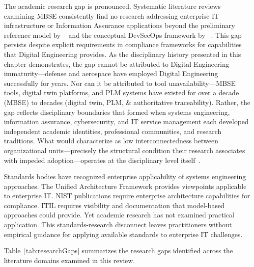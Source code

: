 The academic research gap is pronounced. Systematic literature reviews examining MBSE consistently find no research addressing enterprise IT infrastructure or Information Assurance applications beyond the preliminary reference model by \citeauthor{Bonar_Hastings_2024}~\parencite{Bonar_Hastings_2024} and the conceptual DevSecOps framework by \citeauthor{CMU_SEI_DevSecOps_2023}~\parencite{CMU_SEI_DevSecOps_2023}. This gap persists despite explicit requirements in compliance frameworks for capabilities that Digital Engineering provides. As the disciplinary history presented in this chapter demonstrates, the gap cannot be attributed to Digital Engineering immaturity---defense and aerospace have employed Digital Engineering successfully for years. Nor can it be attributed to tool unavailability---MBSE tools, digital twin platforms, and PLM systems have existed for over a decade (MBSE) to decades (digital twin, PLM, \& authoritative traceability). Rather, the gap reflects disciplinary boundaries that formed when systems engineering, information assurance, cybersecurity, and IT service management each developed independent academic identities, professional communities, and research traditions. What \citeauthor{Henderson_Salado_2024_Org} would characterize as low interconnectedness between organizational units---precisely the structural condition their research associates with impeded adoption---operates at the disciplinary level itself~\parencite{Henderson_Salado_2024_Org}.

Standards bodies have recognized enterprise applicability of systems engineering approaches. The Unified Architecture Framework provides viewpoints applicable to enterprise IT\@. NIST publications require enterprise architecture capabilities for compliance. ITIL requires visibility and documentation that model-based approaches could provide. Yet academic research has not examined practical application. This standards-research disconnect leaves practitioners without empirical guidance for applying available standards to enterprise IT challenges.

Table~\ref{tab:researchGaps} summarizes the research gaps identified across the literature domains examined in this review.

